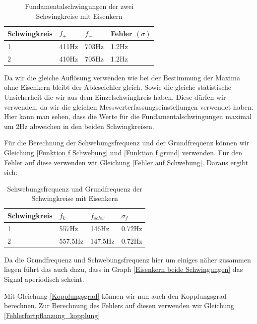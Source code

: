 \documentclass[twoside]{protokoll}
\begin{document}
\begin{table}[H]
    \centering
    \begin{tabularx}{1\textwidth}{X X X X} %
        \toprule
        \textbf{Schwingkreis} & \textbf{$f_+$ } & \textbf{$f_-$ } & \textbf{Fehler $(\sigma)$}\\
        \midrule
        1 & 411Hz & 703Hz & 1.2Hz\\
        2 & 410Hz & 705Hz & 1.2Hz\\
        \bottomrule
    \end{tabularx}
    \caption{Fundamentalschwingungen der zwei Schwingkreise mit Eisenkern}
    \label{•}
\end{table}

Da wir die gleiche Auflösung verwenden wie bei der Bestimmung der Maxima ohne Eisenkern bleibt der Ablesefehler gleich. Sowie die gleiche statistische Unsicherheit die wir aus dem Einzelschwingkreis haben. Diese dürfen wir verwenden, da wir die gleichen Messwerterfassungseinstellungen verwendet haben. 
Hier kann man sehen, dass die Werte für die Fundamentalschwingungen maximal um 2Hz abweichen in den beiden Schwingkreisen.

Für die Berechnung der Schwebungsfrequenz und der Grundfrequenz können wir Gleichung \ref{Funktion f Schwebung} und \ref{Funktion f grund} verwenden. 
Für den Fehler auf diese verwenden wir Gleichung \ref{Fehler auf Schwebung}.
Daraus ergibt sich:

\begin{table}[H]
    \centering
    \begin{tabularx}{1\textwidth}{X X X X} %
        \toprule
        \textbf{Schwingkreis} & \textbf{$f_k$} & \textbf{$f_{schw}$} & \textbf{$\sigma_f$} \\
        \midrule
        1 & 557Hz & 146Hz & 0.72Hz\\
        2 & 557.5Hz & 147.5Hz & 0.72Hz \\
        \bottomrule
    \end{tabularx}
    \caption{Schwebungsfrequenz und Grundfrequenz der Schwingkreise mit Eisenkern}
    \label{•}
\end{table} 
Da die Grundfrequenz und Schwebungsfrequenz hier um einiges näher zusammen liegen führt das auch dazu, dass in Graph \ref{Eisenkern beide Schwingungen} das Signal aperiodisch scheint.

Mit Gleichung \ref{Kopplungsgrad} können wir nun auch den Kopplungsgrad berechnen. Zur Berechnung des Fehlers auf diesen verwenden wir Gleichung \ref{Fehlerfortpflanzung_kopplung}
\end{document}
